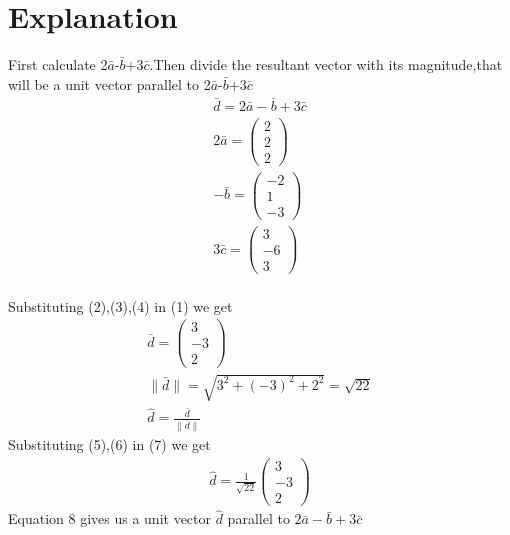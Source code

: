 \documentclass[journal,12pt,twocolumn]{IEEEtran}
\newcommand{\norm}[1]{\| #1 \|}
\begin{document}
\section{Explanation}
First calculate 2$\bar{a}$-$\bar{b}$+3$\bar{c}$.Then divide the resultant vector with its magnitude,that will be a unit vector parallel to 2$\bar{a}$-$\bar{b}$+3$\bar{c}$\\
\vspace{2mm}
\begin{align}
    \bar{d}=2\bar{a}-\bar{b}+3\bar{c}\\
    2\bar{a}=\begin{pmatrix}2\\2\\2\end{pmatrix}\\
    -\bar{b}=\begin{pmatrix}-2\\1\\-3\end{pmatrix}\\
    3\bar{c}=\begin{pmatrix}3\\-6\\3\end{pmatrix}
\end{align}
\vspace{2mm}\\
Substituting (2),(3),(4) in (1) we get\\
\begin{align}
    \bar{d}=\begin{pmatrix}3\\-3\\2\end{pmatrix}\\
    \norm{\bar{d}}=\sqrt{3^2+(-3)^2+2^2}=\sqrt{22}\\
    \hat{d}=\frac{\bar{d}}{\norm{\bar{d}}}
\end{align}
Substituting (5),(6) in (7) we get
\begin{align}
    \boxed{\hat{d}=\frac{1}{\sqrt{22}}\begin{pmatrix}3\\-3\\2\end{pmatrix}}
\end{align}
Equation 8 gives us a unit vector $\hat{d}$ parallel to $2\bar{a}-\bar{b}+3\bar{c}$  
\end{document}
